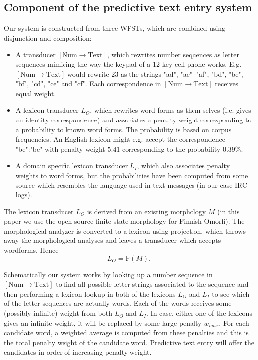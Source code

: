 \documentclass[a4paper,conference]{IEEEtran}
\begin{document}
\subsection{Component of the predictive text entry system}

Our system is constructed from three WFSTs, which are combined using
disjunction and composition:

\begin{itemize}
\item A transducer $[\mathrm{Num}\rightarrow\mathrm{Text}]$, which
  rewrites number sequences as letter sequences mimicing the way the
  keypad of a 12-key cell phone
  works. E.g. $[\mathrm{Num}\rightarrow\mathrm{Text}]$ would rewrite
  $23$ as the strings "ad", "ae", "af", "bd", "be", "bf", "cd", "ce"
  and "cf". Each correspondence in $[\mathrm{Num}\rightarrow\mathrm{Text}]$
  receives equal weight.
\item A lexicon transducer $L_O$, which rewrites word forms as them
  selves (i.e. gives an identity correspondence) and associates a
  penalty weight corresponding to a probability to known word
  forms. The probability is based on corpus frequencies. An English
  lexicon might e.g. accept the correspondence "be":"be" with penalty
  weight $5.41$ corresponding to the probability $0.39\%$.
\item A domain specific lexicon transducer $L_I$, which also
  associates penalty weights to word forms, but the probabilities have
  been computed from some source which resembles the language used in
  text messages (in our case IRC logs).
\end{itemize}

The lexicon transducer $L_O$ is derived from an existing morphology $M$
(in this paper we use the open-source finite-state morphology for
Finnish Omorfi). The morphological analyzer is converted to a lexicon
using projection, which throws away the morphological analyses and
leaves a transducer which accepts wordforms. Hence 
\begin{equation}L_O = \mathrm{P}(M)\text{.}\end{equation}

Schematically our system works by looking up a number sequence in
$[\mathrm{Num}\rightarrow\mathrm{Text}]$ to find all possible letter
strings associated to the sequence and then performing a lexicon
lookup in both of the lexicons $L_O$ and $L_I$ to see which of the
letter sequences are actually words. Each of the words receives some
(possibly infinite) weight from both $L_O$ and $L_I$. In case, either
one of the lexicons gives an infinite weight, it will be replaced by
some large penalty $w_{max}$. For each candidate word, a weighted
average is computed from these penalties and this is the total penalty
weight of the candidate word. Predictive text entry will offer the
candidates in order of increasing penalty weight.
\end{document}
